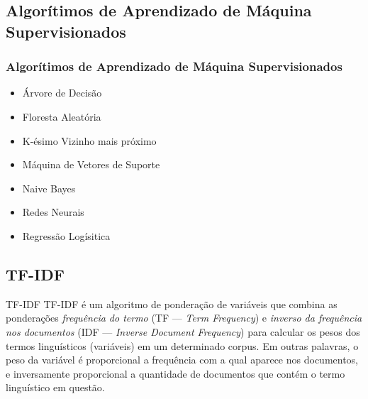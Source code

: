 \documentclass{beamer}
\begin{document}
\subsection{Algorítimos de Aprendizado de Máquina Supervisionados}
\begin{frame}
\frametitle {Algorítimos de Aprendizado de Máquina Supervisionados}
\begin{itemize}
\item Árvore de Decisão
\item Floresta Aleatória
\item K-ésimo Vizinho mais próximo
\item Máquina de Vetores de Suporte
\item Naive Bayes
\item Redes Neurais
\item Regressão Logísitica
\end{itemize}
\end{frame}
\subsection{TF-IDF}
\begin{frame}{TF-IDF}
TF-IDF é um algoritmo de ponderação de variáveis que combina as ponderações \emph{frequência do termo} (TF --- \textit{Term Frequency}) e \emph{inverso da frequência nos documentos} (IDF --- \textit{Inverse Document Frequency}) para calcular os pesos dos termos linguísticos (variáveis) em um determinado corpus. Em outras palavras, o peso da variável é proporcional a frequência com a qual aparece nos documentos, e inversamente proporcional a quantidade de documentos que contém o termo linguístico em questão.
\end{frame}
\end{document}
